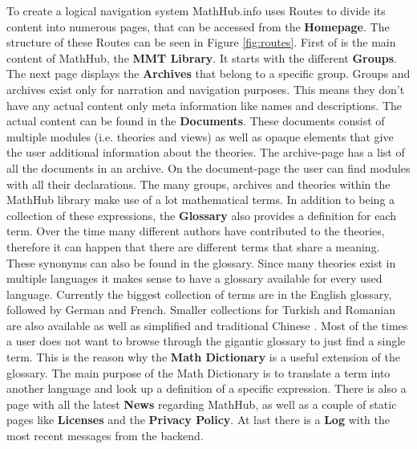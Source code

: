 \documentclass[11pt,a4paper]{article}
\begin{document}
To create a logical navigation system MathHub.info uses Routes to divide its content into numerous pages, that can be accessed from the \textbf{Homepage}.
The structure of these Routes can be seen in Figure \ref{fig:routes}.
\newline \newline
First of is the main content of MathHub, the \textbf{MMT Library}.
It starts with the different \textbf{Groups}.
The next page displays the \textbf{Archives} that belong to a specific group.
Groups and archives exist only for narration and navigation purposes.
This means they don't have any actual content only meta information like names and descriptions.
The actual content can be found in the \textbf{Documents}.
These documents consist of multiple modules (i.e. theories and views) as well as opaque elements that give the user additional information about the theories.
The archive-page has a list of all the documents in an archive.
On the document-page the user can find modules with all their declarations.
\newline \newline
The many groups, archives and theories within the MathHub library make use of a lot mathematical terms.
In addition to being a collection of these expressions, the \textbf{Glossary} also provides a definition for each term.
Over the time many different authors have contributed to the theories, therefore it can happen that there are different terms that share a meaning.
These synonyms can also be found in the glossary.
Since many theories exist in multiple languages it makes sense to have a glossary available for every used language.
Currently the biggest collection of terms are in the English glossary, followed by German and French.
Smaller collections for Turkish and Romanian are also available as well as simplified and traditional Chinese \cite{smglom}.
\newline \newline
Most of the times a user does not want to browse through the gigantic glossary to just find a single term.
This is the reason why the \textbf{Math Dictionary} is a useful extension of the glossary.
The main purpose of the Math Dictionary is to translate a term into another language and look up a definition of a specific expression.
\newline \newline
There is also a page with all the latest \textbf{News} regarding MathHub, as well as a couple of static pages like \textbf{Licenses} and the \textbf{Privacy Policy}.
At last there is a \textbf{Log} with the most recent messages from the backend.
\end{document}
